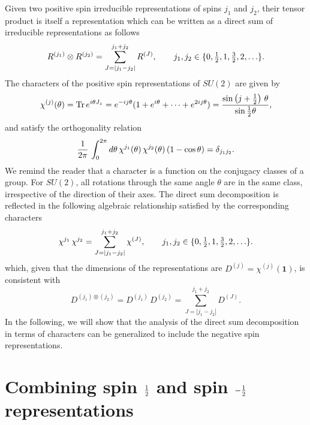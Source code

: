 \documentclass[a4paper,dvips,12pt]{article}
\newcommand {\half} {{1 \over 2}}
\newcommand {\hhalf} {{\textstyle{1 \over 2}}}
\newcommand {\Tr} {\mathrm{Tr}\,}
\begin{document}
    Given two positive spin irreducible representations of spins $j_1$ and
    $j_2$, their tensor product is itself a representation which
    can be written as a direct sum of irreducible representations
    as follows \cite{ELLIOTT}
    \begin{equation}
        R^{(j_1)}\otimes R^{(j_2)}
          = \sum_{J = |j_1 - j_2|}^{j_1 + j_2} R^{(J)}, \qquad
          j_1, j_2 \in \{0, \hhalf, 1, {\textstyle {3\over 2}}, 2,
       \ldots\}. \label{PRODPOSITIVE}
    \end{equation}
    The characters of the positive spin representations of $SU(2)$
    are given by
    \begin{equation}
        \chi^{(j)}(\theta) = \Tr e^{i\theta J_z} =
        e^{-ij\theta}(1 + e^{i\theta} + \cdots + e^{2ij\theta}) = {\sin \left(j + \half\right)\,\theta \over \sin
        \half\theta}, \label{CHARPOSITIVE}
    \end{equation}
    and satisfy the orthogonality relation
    \begin{equation}
        {1\over 2\pi} \,\int_0^{2\pi}
        d\theta\,\chi^{j_1}(\theta)\,
        \chi^{j_2}(\theta) \, (1 - \cos \theta) = \delta_{j_1 j_2}.
        \label{ORTHOGONALITY}
    \end{equation}
    We remind the reader that a character is a function on the conjugacy
    classes of a group.  For $SU(2)$,
    all rotations through the same angle $\theta$ are in the same class,
    irrespective of the direction of their axes.  The direct sum
    decomposition is reflected in the following algebraic
    relationship satisfied by the corresponding characters
    \begin{equation}
        \chi^{{j_1}}\, \chi^{{j_2}} =
           \sum_{J = |j_1 - j_2|}^{j_1 + j_2} \chi^{(J)}, \qquad
          j_1, j_2 \in \{0, \hhalf, 1,{\textstyle {3\over 2}},2,
             \ldots\}. \label{PRODCHARPOSITIVE}
    \end{equation}
    which, given that the dimensions of the representations are
    $D^{(j)} = \chi^{(j)}(\mathbf{1})$, is consistent with
    \begin{equation}
        D^{(j_1)\otimes(j_2)} = D^{(j_1)}\, D^{(j_2)} = \sum_{J = |j_1 - j_2|}^{j_1 + j_2}
        D^{(J)}.
    \end{equation}
    In the following, we will show that the analysis of the direct sum decomposition
    in terms of characters can be generalized to include the negative spin
    representations.

    \section{Combining spin $\half$ and spin $-\half$ representations}
    \label{HALFHALF}
\end{document}
